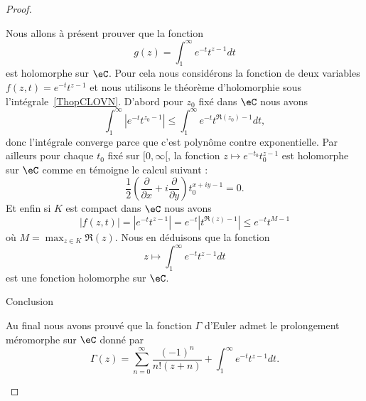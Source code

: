 \begin{proof}
\begin{subproof}
            Nous allons à présent prouver que la fonction
            \begin{equation}
                g(z)=\int_1^{\infty} e^{-t}t^{z-1}dt
            \end{equation}
            est holomorphe sur \( \eC\). Pour cela nous considérons la fonction de deux variables \( f(z,t)= e^{-t}t^{z-1}\) et nous utilisons le théorème d'holomorphie sous l'intégrale~\ref{ThopCLOVN}. D'abord pour \( z_0\) fixé dans \( \eC\) nous avons
            \begin{equation}
                \int_1^{\infty}|  e^{-t}t^{z_0-1} |\leq \int_1^{\infty} e^{-t}t^{\Re(z_0)-1}dt,
            \end{equation}
            donc l'intégrale converge parce que c'est polynôme contre exponentielle. Par ailleurs pour chaque \( t_0\) fixé sur \( \mathopen[ 0 , \infty [\), la fonction \( z\mapsto  e^{-t_0}t_0^{z-1}\) est holomorphe sur \( \eC\) comme en témoigne le calcul suivant :
                \begin{equation}
                    \frac{ 1 }{2}\left( \frac{ \partial  }{ \partial x }+i\frac{ \partial  }{ \partial y } \right)t_0^{x+iy-1}=0.
                \end{equation}
                Et enfin si \( K\) est compact dans \( \eC\) nous avons
                \begin{equation}
                    | f(z,t) |=|  e^{-t}t^{z-1} |= e^{-t}| t^{\Re(z)-1} |\leq  e^{-t}t^{M-1}
                \end{equation}
                où \( M=\max_{z\in K}\Re(z)\). Nous en déduisons que la fonction
                \begin{equation}
                    z\mapsto\int_1^{\infty} e^{-t}t^{z-1}dt
                \end{equation}
                est une fonction holomorphe sur \( \eC\).

            \item[Conclusion]

                Au final nous avons prouvé que la fonction \( \Gamma\) d'Euler admet le prolongement méromorphe sur \( \eC\) donné par
                \begin{equation}
                    \Gamma(z)=\sum_{n=0}^{\infty}\frac{ (-1)^n }{ n!(z+n) }+\int_1^{\infty} e^{-t}t^{z-1}dt.
                \end{equation}
    \end{subproof}
\end{proof}

